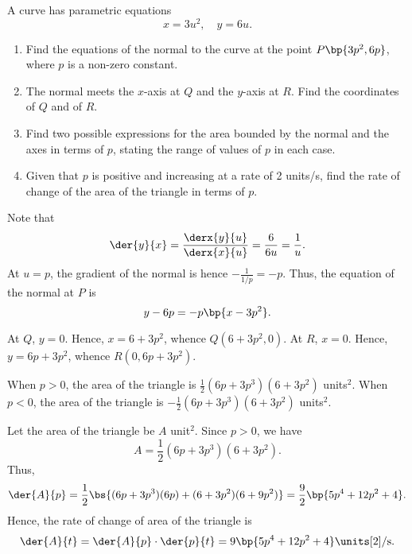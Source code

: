 \begin{problem}
    A curve has parametric equations \[x = 3u^2, \quad y = 6u.\]
    \begin{enumerate}
        \item Find the equations of the normal to the curve at the point $P\bp{3p^2, 6p}$, where $p$ is a non-zero constant.
        \item The normal meets the $x$-axis at $Q$ and the $y$-axis at $R$. Find the coordinates of $Q$ and of $R$.
        \item Find two possible expressions for the area bounded by the normal and the axes in terms of $p$, stating the range of values of $p$ in each case.
        \item Given that $p$ is positive and increasing at a rate of 2 units/s, find the rate of change of the area of the triangle in terms of $p$.
    \end{enumerate}
\end{problem}
\begin{solution}
    \begin{ppart}
        Note that \[\der{y}{x} = \frac{\derx{y}{u}}{\derx{x}{u}} = \frac{6}{6u} = \frac1u.\] At $u = p$, the gradient of the normal is hence $-\frac1{1/p} = -p$. Thus, the equation of the normal at $P$ is \[y - 6p = -p\bp{x - 3p^2}.\]
    \end{ppart}
    \begin{ppart}
        At $Q$, $y = 0$. Hence, $x = 6 + 3p^2$, whence $Q(6 + 3p^2, 0)$. At $R$, $x = 0$. Hence, $y = 6p + 3p^2$, whence $R(0, 6p+3p^2)$.
    \end{ppart}
    \begin{ppart}
        When $p > 0$, the area of the triangle is $\frac12 (6p + 3p^3)(6 + 3p^2)$ units$^2$. When $p < 0$, the area of the triangle is $-\frac12 (6p + 3p^3)(6 + 3p^2)$ units$^2$.
    \end{ppart}
    \begin{ppart}
        Let the area of the triangle be $A$ unit$^2$. Since $p>0$, we have \[A = \frac12 (6p + 3p^3)(6 + 3p^2).\] Thus, \[\der{A}{p} = \frac12 \bs{(6p + 3p^3)(6p) + (6+3p^2)(6 + 9p^2)} = \frac92 \bp{5p^4 + 12p^2 + 4}.\] Hence, the rate of change of area of the triangle is \[\der{A}{t} = \der{A}{p} \cdot \der{p}{t} = 9\bp{5p^4 + 12p^2 + 4} \units[2]\text{/s}.\]
    \end{ppart}
\end{solution}

